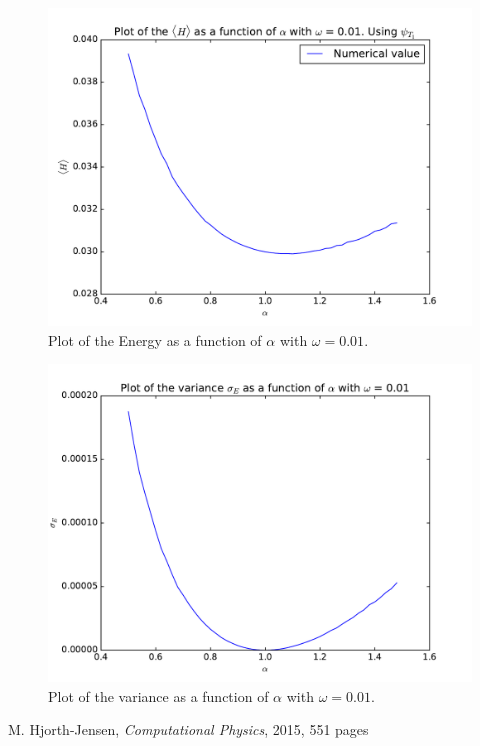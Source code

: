 \documentclass[12pt]{article}
\begin{document}
\begin{figure}[h]
\centering
\includegraphics[width=\linewidth]{Plots/Energy_alpha_plot_omega001.pdf}
\caption{Plot of the Energy as a function of $\alpha$ with $\omega = 0.01$.}
\label{fig:Energy_alpha_omega001}
\end{figure}
\begin{figure}[h]
\centering
\includegraphics[width=\linewidth]{Plots/Variance_alpha_plot_omega001.pdf}
\caption{Plot of the variance as a function of $\alpha$ with $\omega = 0.01$.}
\label{fig:Variance_alpha_omega001}
\end{figure}


\FloatBarrier
\begin{thebibliography}{1}
     M. Hjorth-Jensen, \emph{Computational Physics}, 2015, 551 pages
\end{thebibliography}
\end{document}
